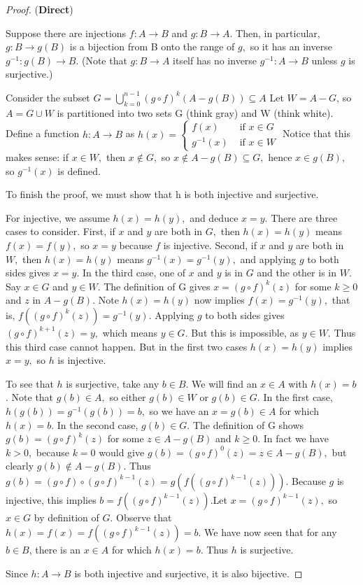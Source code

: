 \documentclass[12pt]{book}
\theoremstyle{definition}\newtheorem{dfn}{Définition}[chapter]
\theoremstyle{plain}\newtheorem{thm}{Théorème}[chapter]
\theoremstyle{plain}\newtheorem{prp}{Proposition}[chapter]
\theoremstyle{plain}\newtheorem{lem}{\bf Lemme}[chapter]
\theoremstyle{plain}\newtheorem{axm}{\bf Axiome}[chapter]
\theoremstyle{plain}\newtheorem{lmm}{\bf Lemme}[chapter]
\theoremstyle{plain}\newtheorem{cor}{\bf Corollaire}[chapter]
\theoremstyle{remark}\newtheorem{rem}{Remarque}[chapter]
\begin{document}
 \begin{proof}
({\bf Direct})

Suppose there are injections $f: A \rightarrow B$ and $g: B \rightarrow A$. Then, in particular, $g: B \rightarrow g(B)$ is a bijection from B onto the range of $g,$ so it has an inverse $g^{-1}: g(B) \rightarrow B$. (Note that $g: B \rightarrow A$ itself has no inverse $g^{-1}: A \rightarrow B$ unless $g$ is surjective.)

Consider the subset $G=\bigcup\limits_{k=0}^{n-1}(g \circ f)^{k}(A-g(B)) \subseteq A$
Let $W=A-G$, so $A=G \cup W$ is partitioned into two sets G (think gray) and W (think white). Define a function $h: A \rightarrow B$ as
$h(x)=\left\{\begin{array}{cl}f(x) & \text { if } x \in G \\ g^{-1}(x) & \text { if } x \in W\end{array}\right.$
Notice that this makes sense: if $x \in W,$ then $x \notin G,$ so $x \notin A-g(B) \subseteq G,$ hence $x \in g(B),$ so $g^{-1}(x)$ is defined.

To finish the proof, we must show that $\mathrm{h}$ is both injective and surjective.

For injective, we assume $h(x)=h(y),$ and deduce $x=y .$ There are three cases to consider. First, if $x$ and $y$ are both in $G,$ then $h(x)=h(y)$ means $f(x)=f(y),$ so $x=y$ because $f$ is injective. Second, if $x$ and $y$ are both in $W,$ then $h(x)=h(y)$ means $g^{-1}(x)=g^{-1}(y),$ and applying $g$ to both sides gives $x=y$. In the third case, one of $x$ and $y$ is in $G$ and the other is in $W$. Say $x \in G$ and $y \in W$. The definition of G gives $x=(g \circ f)^{k}(z)$ for some $k \geq 0$ and $z$ in $A-g(B)$. Note $h(x)=h(y)$ now implies $f(x)=g^{-1}(y),$ that is, $f\left((g \circ f)^{k}(z)\right)=g^{-1}(y)$. Applying $g$ to both sides gives $(g \circ f)^{k+1}(z)=y,$ which means $y \in G .$ But this is impossible, as $y \in W$. Thus this third case cannot happen. But in the first two cases $h(x)=h(y)$ implies $x=y,$ so $h$ is injective.

To see that $h$ is surjective, take any $b \in B$. We will find an $x \in A$ with $h(x)=b$. Note that $g(b) \in A,$ so either $g(b) \in W$ or $g(b) \in G$. In the first case, $h(g(b))=g^{-1}(g(b))=b,$ so we have an $x=g(b) \in A$ for which $h(x)=b$. In the second case, $g(b) \in G .$ The definition of G shows $g(b)=(g \circ f)^{k}(z)$
for some $z \in A-g(B)$ and $k \geq 0$. In fact we have $k>0,$ because $k=0$ would give $g(b)=(g \circ f)^{0}(z)=z \in A-g(B),$ but clearly $g(b) \notin A-g(B)$. Thus $g(b)=(g \circ f) \circ(g \circ f)^{k-1}(z)=g\left(f\left((g \circ f)^{k-1}(z)\right)\right) .$ Because $g$ is injective, this implies $b=f\left((g \circ f)^{k-1}(z)\right).$Let $x=(g \circ f)^{k-1}(z),$ so $x \in G$ by definition of $G$. Observe that $h(x)=f(x)=f\left((g \circ f)^{k-1}(z)\right)=b$. We have now seen that for any $b \in B$, there is an $x \in A$ for which $h(x)=b$. Thus $h$ is surjective.

Since $h: A \rightarrow B$ is both injective and surjective, it is also bijective.

 \end{proof} 
\end{document}
